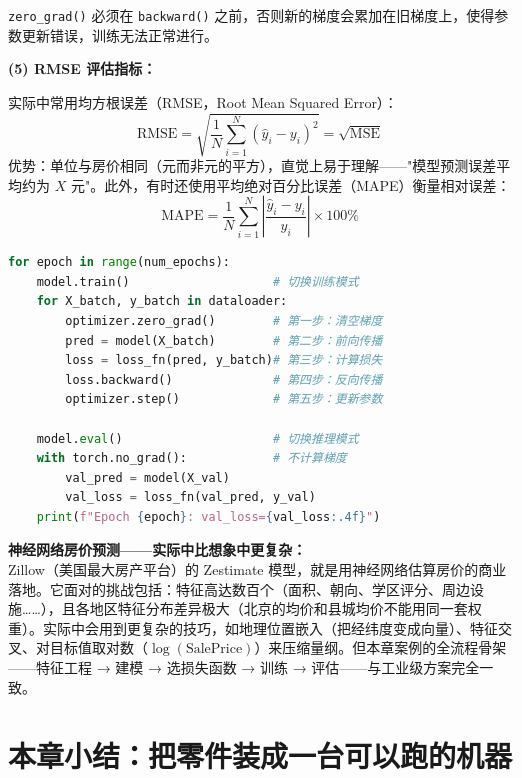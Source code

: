 \documentclass[a4paper,11pt]{ctexart}
\begin{document}
\begin{solutionbox}[参考答案与详细解析]
    \texttt{zero\_grad()} 必须在 \texttt{backward()} 之前，否则新的梯度会累加在旧梯度上，使得参数更新错误，训练无法正常进行。

    \textbf{(5) RMSE 评估指标：}

    实际中常用均方根误差（RMSE，Root Mean Squared Error）：
    \[
    \text{RMSE} = \sqrt{\frac{1}{N}\sum_{i=1}^{N}(\hat{y}_i - y_i)^2} = \sqrt{\text{MSE}}
    \]
    优势：单位与房价相同（元而非元的平方），直觉上易于理解——"模型预测误差平均约为 $X$ 元"。此外，有时还使用平均绝对百分比误差（MAPE）衡量相对误差：
    \[
    \text{MAPE} = \frac{1}{N}\sum_{i=1}^{N}\left|\frac{\hat{y}_i - y_i}{y_i}\right| \times 100\%
    \]

    \begin{keybox}[房价预测完整训练循环模板]
        \begin{lstlisting}[language=Python]
for epoch in range(num_epochs):
    model.train()                    # 切换训练模式
    for X_batch, y_batch in dataloader:
        optimizer.zero_grad()        # 第一步：清空梯度
        pred = model(X_batch)        # 第二步：前向传播
        loss = loss_fn(pred, y_batch)# 第三步：计算损失
        loss.backward()              # 第四步：反向传播
        optimizer.step()             # 第五步：更新参数

    model.eval()                     # 切换推理模式
    with torch.no_grad():            # 不计算梯度
        val_pred = model(X_val)
        val_loss = loss_fn(val_pred, y_val)
    print(f"Epoch {epoch}: val_loss={val_loss:.4f}")
        \end{lstlisting}
    \end{keybox}
\end{solutionbox}

\begin{appbox}[现实应用场景]
    \textbf{神经网络房价预测——实际中比想象中更复杂：}\\
    Zillow（美国最大房产平台）的 Zestimate 模型，就是用神经网络估算房价的商业落地。它面对的挑战包括：特征高达数百个（面积、朝向、学区评分、周边设施……），且各地区特征分布差异极大（北京的均价和县城均价不能用同一套权重）。实际中会用到更复杂的技巧，如地理位置嵌入（把经纬度变成向量）、特征交叉、对目标值取对数（$\log(\text{SalePrice})$）来压缩量纲。但本章案例的全流程骨架——特征工程 → 建模 → 选损失函数 → 训练 → 评估——与工业级方案完全一致。
\end{appbox}

\section{本章小结：把零件装成一台可以跑的机器}
\end{document}
